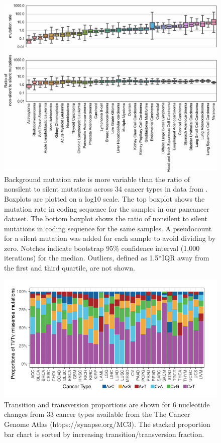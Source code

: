 \begin{figure}
  \centering
  \makeatletter
  \let\@currsize\normalsize
  \includegraphics[width=0.9\linewidth]{figures/chapter2/mut_rate_and_ratiometric.jpg}
  \caption[Background mutation rate variability]{Background mutation rate is more variable than the ratio of nonsilent to silent mutations across 34 cancer types in data from \cite{RN14, RN71}. Boxplots are plotted on a log10 scale. The top boxplot shows the mutation rate in coding sequence for the samples in our pancancer dataset. The bottom boxplot shows the ratio of nonsilent to silent mutations in coding sequence for the same samples. A pseudocount for a silent mutation was added for each sample to avoid dividing by zero. Notches indicate bootstrap 95\% confidence interval (1,000 iterations) for the median. Outliers, defined as 1.5*IQR away from the first and third quartile, are not shown.}
  \label{fig:mut_rate_variability}
\end{figure}

\begin{figure}
  \centering
  \makeatletter
  \let\@currsize\normalsize
  \includegraphics[width=0.9\linewidth]{figures/chapter2/mutation_context.pdf}
  \caption[Transition and transversion proportions in cancer]{Transition and transversion proportions are shown for 6 nucleotide changes from 33 cancer types available from the The Cancer Genome Atlas (https://synapse.org/MC3). The stacked proportion bar chart is sorted by increasing transition/transversion fraction.}
  \label{fig:mutation_context}
\end{figure}

